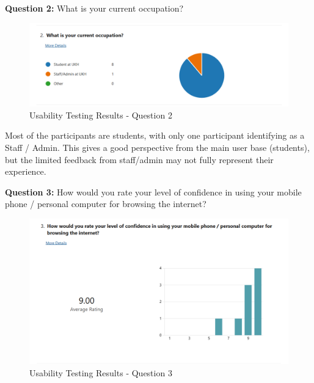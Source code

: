 \begin{justify}
\vspace{0.25cm}
\newendline \textbf{Question 2:} What is your current occupation?

\begin{figure}[H]
    \centerline{\includegraphics[width=150mm,scale=1]{figures/implementation_and_testing/testing/MUT/answers/Answers (2).png}}
    \caption{Usability Testing Results - Question 2}
    \label{Usability Testing Results - Question 2}
\end{figure}

\vspace{-0.25cm}
\newendline Most of the participants are students, with only one participant identifying as a Staff / Admin. This gives a good perspective from the main user base (students), but the limited feedback from staff/admin may not fully represent their experience.

\vspace{0.25cm}
\newendline \textbf{Question 3:} How would you rate your level of confidence in using your mobile phone / personal computer for browsing the internet?

\begin{figure}[H]
    \centerline{\includegraphics[width=150mm,scale=1]{figures/implementation_and_testing/testing/MUT/answers/Answers (3).png}}
    \caption{Usability Testing Results - Question 3}
    \label{Usability Testing Results - Question 3}
\end{figure}


\end{justify}
